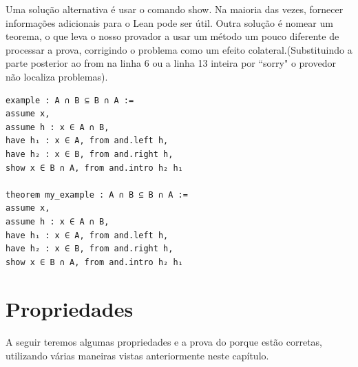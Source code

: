 Uma solução alternativa é usar o comando {\selectfont show}. Na maioria das vezes, fornecer informações adicionais para o Lean pode ser útil. Outra solução é nomear um teorema, o que leva o nosso provador a usar um método um pouco diferente de processar a prova, corrigindo o problema como um efeito colateral.(Substituindo a parte posterior ao {\selectfont from} na linha 6 ou a linha 13 inteira por ``{\selectfont sorry}" o provedor não localiza problemas).

\begin{lstlisting}
example : A ∩ B ⊆ B ∩ A :=
assume x,
assume h : x ∈ A ∩ B,
have h₁ : x ∈ A, from and.left h,
have h₂ : x ∈ B, from and.right h,
show x ∈ B ∩ A, from and.intro h₂ h₁

theorem my_example : A ∩ B ⊆ B ∩ A :=
assume x,
assume h : x ∈ A ∩ B,
have h₁ : x ∈ A, from and.left h,
have h₂ : x ∈ B, from and.right h,
show x ∈ B ∩ A, from and.intro h₂ h₁ \end{lstlisting}

\section{Propriedades}
A seguir teremos algumas propriedades e a prova do porque estão corretas, utilizando várias maneiras vistas anteriormente neste capítulo.

